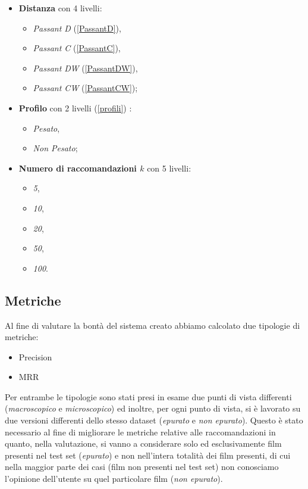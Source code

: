 \begin{itemize}
\item \textbf{Distanza} con 4 livelli:
    \begin{itemize}
        \item \emph{Passant D} (\ref{PassantD}),
        \item \emph{Passant C} (\ref{PassantC}),
        \item \emph{Passant DW} (\ref{PassantDW}),
        \item \emph{Passant CW} (\ref{PassantCW});
    \end{itemize}
\item \textbf{Profilo} con 2 livelli (\ref{profili}) :
    \begin{itemize}
        \item \emph{Pesato},
        \item \emph{Non Pesato};
    \end{itemize}
\item \textbf{Numero di raccomandazioni $k$} con 5 livelli:
    \begin{itemize}
        \item \emph{5},
        \item \emph{10},
        \item \emph{20},
        \item \emph{50},
        \item \emph{100}.
    \end{itemize}
\end{itemize}
\subsection{Metriche}
\label{metriche}
Al fine di valutare la bontà del sistema creato abbiamo calcolato due tipologie di metriche:
\begin{itemize}
\item Precision
\item MRR
\end{itemize}
Per entrambe le tipologie sono stati presi in esame due punti di vista differenti (\emph{macroscopico} e \emph{microscopico}) ed inoltre, per ogni punto di vista, si è lavorato su due versioni differenti dello stesso dataset (\emph{epurato} e \emph{non epurato}). Questo è stato necessario al fine di migliorare le metriche relative alle raccomandazioni in quanto, nella valutazione, si vanno a considerare solo ed esclusivamente film presenti nel test set (\emph{epurato}) e non nell'intera totalità dei film presenti, di cui nella maggior parte dei casi (film non presenti nel test set) non conosciamo l'opinione dell'utente su quel particolare film (\emph{non epurato}).

